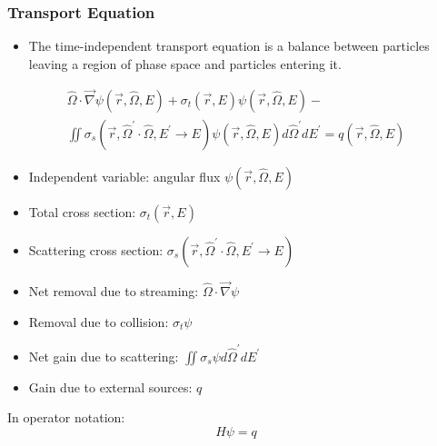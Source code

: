 \documentclass[t]{beamer}
\begin{document}
\begin{frame}
  \frametitle{Transport Equation}
  \begin{itemize}
    \item The time-independent transport equation is a balance between particles
          leaving a region of phase space and particles entering it.
  \end{itemize}
  \vskip-0.1in
  \begin{multline}
    \hat{\Omega}\cdot\vec{\nabla}\psi\left(\vec{r},\hat{\Omega},E\right) +
    \sigma_t\left(\vec{r},E\right)\psi\left(\vec{r},\hat{\Omega},E\right) - \\
    \iint\sigma_s\left(\vec{r},\hat{\Omega}^\prime\cdot\hat{\Omega},E^\prime\rightarrow E\right)\psi\left(\vec{r},\hat{\Omega},E\right)d\hat{\Omega}^\prime dE^\prime =
    q\left(\vec{r},\hat{\Omega},E\right)
  \end{multline}
  \vskip-0.1in
  \begin{scriptsize}\begin{itemize}
    \item Independent variable: angular flux
          $\psi\left(\vec{r},\hat{\Omega},E\right)$
    \item Total cross section:
          $\sigma_t\left(\vec{r},E\right)$
    \item Scattering cross section:
          $\sigma_s\left(\vec{r},\hat{\Omega}^\prime\cdot\hat{\Omega},E^\prime\rightarrow E\right)$
    \item Net removal due to streaming:
          $\hat{\Omega}\cdot\vec{\nabla}\psi$
    \item Removal due to collision:
          $\sigma_t\psi$
    \item Net gain due to scattering:
          $\iint\sigma_s\psi d\hat{\Omega}^\prime dE^\prime$
    \item Gain due to external sources:
          $q$
  \end{itemize}\end{scriptsize}
  In operator notation:
  \begin{equation}
    H\psi = q
  \end{equation}
\end{frame}
\end{document}
